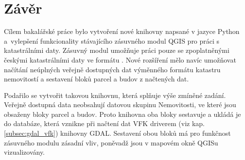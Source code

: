 \chapter{Závěr}
\label{5-zaver}

Cílem bakalářské práce bylo vytvoření nové knihovny napsané v jazyce
Python a~vylepšení funkcionality stávajícího zásuvného modul QGIS
pro práci s katastrálními daty. Zásuvný modul umožňuje práci
pouze se zpoplatněnými českými katastrálními daty ve formátu
. Nové rozšíření mělo navíc umožňovat načítání neúplných
veřejně dostupných dat výměnného formátu katastru nemovitostí a
sestavení bloků parcel a budov z načtených dat.

Podařilo se vytvořit takovou knihovnu, která
splňuje výše zmíněné zadání.
Veřejně dostupná data neobsahují datovou skupinu Nemovitosti, ve které
jsou obsaženy bloky parcel a budov. Proto knihovna oba bloky sestavuje
a ukládá je do databáze, která vznikne při načtení dat VFK driverem
(viz kap. \ref{subsec:gdal_vfk}) knihovny GDAL. Sestavení obou bloků
má pro funkčnost zásuvného modulu zásadní vliv, poněvadž jsou v
mapovém okně QGISu vizualizovány.

